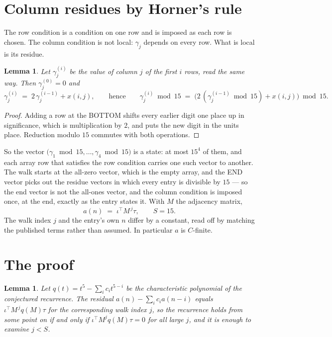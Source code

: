 \documentclass[11pt,a4paper]{article}
\theoremstyle{plain}
\newtheorem{lemma}[theorem]{Lemma}
\theoremstyle{definition}
\begin{document}
\section{Column residues by Horner's rule}

The row condition is a condition on one row and is imposed as each row is chosen. The column
condition is not local: $\gamma_j$ depends on every row. What is local is its residue.

\begin{lemma}\label{lem:horner}
Let $\gamma_j^{(i)}$ be the value of column $j$ of the first $i$ rows, read the same way.
Then $\gamma_j^{(0)}=0$ and
\[
\gamma_j^{(i)}\;=\;2\,\gamma_j^{(i-1)}+x(i,j),
\qquad\text{hence}\qquad
\gamma_j^{(i)}\bmod 15\;=\;
\bigl(2\,(\gamma_j^{(i-1)}\bmod 15)+x(i,j)\bigr)\bmod 15 .
\]
\end{lemma}

\begin{proof}
Adding a row at the BOTTOM shifts every earlier digit one place up in significance, which is
multiplication by $2$, and puts the new digit in the units place. Reduction modulo
$15$ commutes with both operations.
\end{proof}

So the vector $\bigl(\gamma_1\bmod 15,\dots,\gamma_{4}\bmod
15\bigr)$ is a state: at most $15^{4}$ of them, and each array row
that satisfies the row condition carries one such vector to another. The walk starts at the
all-zero vector, which is the empty array, and the END vector picks out the residue vectors in
which every entry is divisible by $15$ --- so the end vector is not the all-ones
vector, and the column condition is imposed once, at the end, exactly as the entry states it.
With $M$ the adjacency matrix,
\[
a(n)\;=\;\iota^{\!\top}M^{\,j}\tau ,\qquad S=15.
\]
The walk index $j$ and the entry's own $n$ differ by a constant, read off by matching the
published terms rather than assumed. In particular $a$ is $C$-finite.

\section{The proof}

\begin{lemma}\label{lem:crit}
Let $q(t)=t^{5}-\sum_i c_it^{5-i}$ be the characteristic polynomial of the
conjectured recurrence. The residual $a(n)-\sum_ic_ia(n-i)$ equals
$\iota^{\!\top}M^{\,j}q(M)\tau$ for the corresponding walk index $j$, so the recurrence
holds from some point on if and only if $\iota^{\!\top}M^{j}q(M)\tau=0$ for all large $j$,
and it is enough to examine $j<S$.
\end{lemma}
\end{document}

